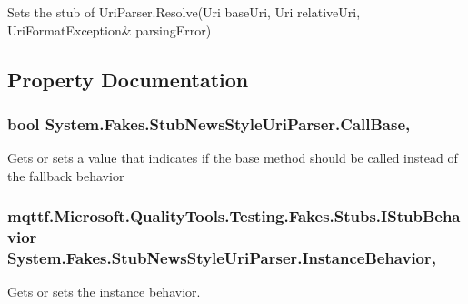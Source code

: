 Sets the stub of Uri\-Parser.\-Resolve(Uri base\-Uri, Uri relative\-Uri, Uri\-Format\-Exception\& parsing\-Error)



\subsection{Property Documentation}
\hypertarget{class_system_1_1_fakes_1_1_stub_news_style_uri_parser_a00571bf16fe302fe20f49fb310a36cbe}{
\subsubsection[{Call\-Base}]{\setlength{\rightskip}{0pt plus 5cm}bool System.\-Fakes.\-Stub\-News\-Style\-Uri\-Parser.\-Call\-Base\hspace{0.3cm}{\ttfamily [get]}, {\ttfamily [set]}}}\label{class_system_1_1_fakes_1_1_stub_news_style_uri_parser_a00571bf16fe302fe20f49fb310a36cbe}


Gets or sets a value that indicates if the base method should be called instead of the fallback behavior

\hypertarget{class_system_1_1_fakes_1_1_stub_news_style_uri_parser_a37b6633f69f3e6be235304afb82a896e}{
\subsubsection[{Instance\-Behavior}]{\setlength{\rightskip}{0pt plus 5cm}mqttf.\-Microsoft.\-Quality\-Tools.\-Testing.\-Fakes.\-Stubs.\-I\-Stub\-Behavior System.\-Fakes.\-Stub\-News\-Style\-Uri\-Parser.\-Instance\-Behavior\hspace{0.3cm}{\ttfamily [get]}, {\ttfamily [set]}}}\label{class_system_1_1_fakes_1_1_stub_news_style_uri_parser_a37b6633f69f3e6be235304afb82a896e}


Gets or sets the instance behavior.

